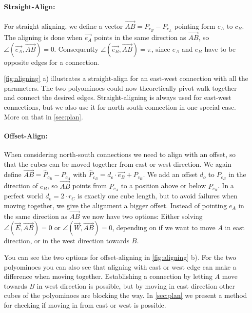 \paragraph{Straight-Align:}

For straight aligning, we define a vector $\overrightarrow{AB} = P_{c_B} - P_{c_A}$ pointing form $c_A$ to $c_B$.
The aligning is done when $\vec{e_A}$ points in the same direction as $\overrightarrow{AB}$, so $\angle \left( \vec{e_A}, \overrightarrow{AB} \right) = 0$.
Consequently $\angle \left( \vec{e_B}, \overrightarrow{AB} \right) = \pi$, since $e_A$ and $e_B$ have to be opposite edges for a connection.

\autoref{fig:aligning} a) illustrates a straight-align for an east-west connection with all the parameters.
The two polyominoes could now theoretically pivot walk together and connect the desired edges.
Straight-aligning is always used for east-west connections, but we also use it for north-south connection in one special case. More on that in \autoref{sec:plan}.

\paragraph{Offset-Align:}

When considering north-south connections we need to align with an offset, so that the cubes can be moved together from east or west direction.
We again define $\overrightarrow{AB} = \hat{P}_{c_B} - P_{c_A}$ with $\hat{P}_{c_B} = d_o \cdot \vec{e_B} + P_{c_B}$.
We add an offset $d_o$ to $P_{c_B}$ in the direction of $e_B$, so $\overrightarrow{AB}$ points from $P_{c_A}$ to a position above or below $P_{c_B}$.
In a perfect world $d_o = 2 \cdot r_C$ is exactly one cube length, but to avoid failures when moving together, we give the alignment a bigger offset.
Instead of pointing $e_A$ in the same direction as $\overrightarrow{AB}$ we now have two options:
Either solving $\angle \left( \vec{E}, \overrightarrow{AB} \right) = 0$ or $\angle \left( \vec{W}, \overrightarrow{AB} \right) = 0$, depending on if we want to move $A$ in east direction, or in the west direction towards $B$.

You can see the two options for offset-aligning in \autoref{fig:aligning} b).
For the two polyominoes you can also see that aligning with east or west edge can make a difference when moving together.
Establishing a connection by letting $A$ move towards $B$ in west direction is possible, but by moving in east direction other cubes of the polyominoes are blocking the way.
In \autoref{sec:plan} we present a method for checking if moving in from east or west is possible. 

